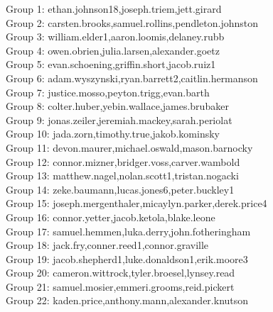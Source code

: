 \documentclass[10pt]{beamer}
\begin{document}
\begin{frame}
\footnotesize
Group 1: ethan.johnson18,joseph.triem,jett.girard\\
Group 2: carsten.brooks,samuel.rollins,pendleton.johnston\\
Group 3: william.elder1,aaron.loomis,delaney.rubb\\
Group 4: owen.obrien,julia.larsen,alexander.goetz\\
Group 5: evan.schoening,griffin.short,jacob.ruiz1\\
Group 6: adam.wyszynski,ryan.barrett2,caitlin.hermanson\\
Group 7: justice.mosso,peyton.trigg,evan.barth\\
Group 8: colter.huber,yebin.wallace,james.brubaker\\
Group 9: jonas.zeiler,jeremiah.mackey,sarah.periolat\\
Group 10: jada.zorn,timothy.true,jakob.kominsky\\
Group 11: devon.maurer,michael.oswald,mason.barnocky\\
Group 12: connor.mizner,bridger.voss,carver.wambold\\
Group 13: matthew.nagel,nolan.scott1,tristan.nogacki\\
Group 14: zeke.baumann,lucas.jones6,peter.buckley1\\
Group 15: joseph.mergenthaler,micaylyn.parker,derek.price4\\
Group 16: connor.yetter,jacob.ketola,blake.leone\\
Group 17: samuel.hemmen,luka.derry,john.fotheringham\\
Group 18: jack.fry,conner.reed1,connor.graville\\
Group 19: jacob.shepherd1,luke.donaldson1,erik.moore3\\
Group 20: cameron.wittrock,tyler.broesel,lynsey.read\\
Group 21: samuel.mosier,emmeri.grooms,reid.pickert\\
Group 22: kaden.price,anthony.mann,alexander.knutson\\\end{frame}
\end{document}
